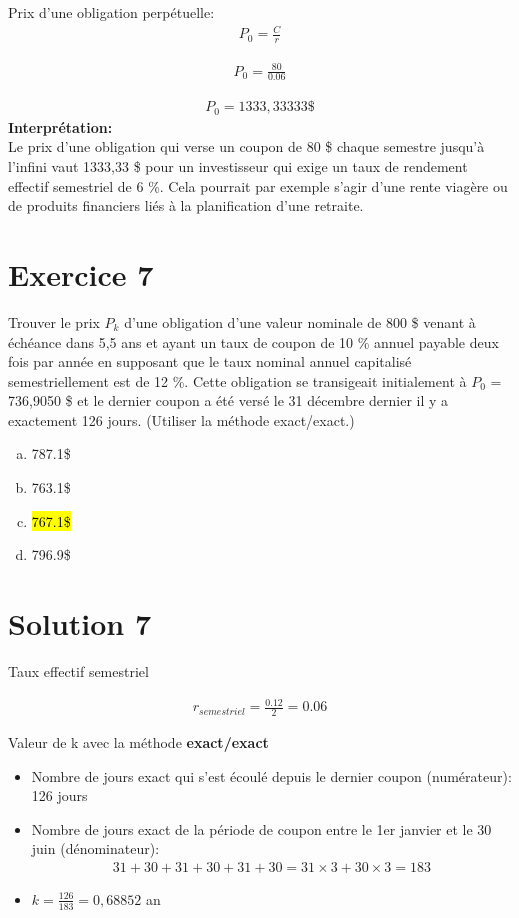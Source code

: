 \documentclass[10pt,a4paper]{article}
\begin{document}
\vspace{0.5cm}
Prix d'une obligation perpétuelle:
\begin{align*}
P_0 = \frac{C}{r}
\end{align*}

\begin{align*}
P_0 = \frac{80}{0.06}
\end{align*}

\begin{align*}
P_0 = 1333,33333 \$
\end{align*}
\textbf{Interprétation:} \\ Le prix d'une obligation qui verse un coupon de 80 \$ chaque semestre jusqu'à l'infini vaut 1333,33 \$ pour un investisseur qui exige un taux de rendement effectif semestriel de 6 \%. Cela pourrait par exemple s'agir d'une rente viagère ou de produits financiers liés à la planification d'une retraite.

\newpage

\section*{Exercice 7}
Trouver le prix $P_k$ d’une obligation d’une valeur nominale de 800 \$ venant à échéance dans 5,5 ans et ayant un taux de coupon de 10 \% annuel payable deux fois par année en supposant que le taux nominal annuel capitalisé semestriellement est de 12 \%.  Cette obligation se transigeait initialement à $P_0$ = 736,9050 \$ et le dernier coupon a été versé le 31 décembre dernier il y a exactement 126 jours. (Utiliser la méthode exact/exact.)

\begin{enumerate}[a)]
\item 787.1\$
\item 763.1\$
\item \hl{767.1\$}
\item 796.9\$
\end{enumerate}

\section*{Solution 7}
Taux effectif semestriel

\begin{align*}
r_{semestriel} = \frac{0.12}{2}= 0.06
\end{align*}

Valeur de k avec la méthode \textbf{exact/exact}
\begin{itemize}

\item  Nombre de jours exact qui s'est écoulé depuis le dernier coupon (numérateur): 126 jours

\item Nombre de jours exact de la période de coupon entre le 1er janvier et le 30 juin (dénominateur):
\begin{align*}
31+30+31+30+31+30 = 31 \times 3 + 30 \times 3 = 183 
\end{align*}

\item $k = \frac{126}{183} = 0,68852$ an
\end{itemize}
\end{document}
